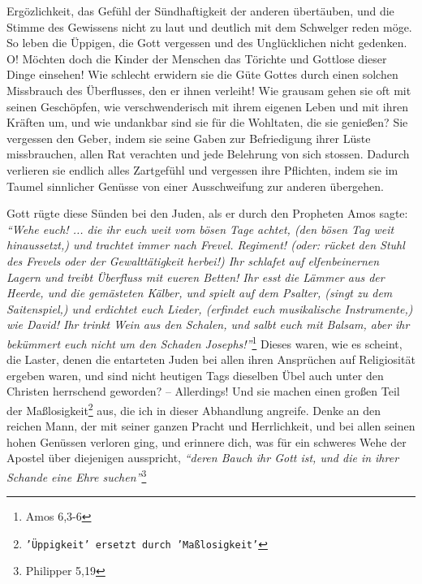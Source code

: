 Ergözlichkeit, das Gefühl der Sündhaftigkeit der anderen
übertäuben, und die
Stimme des Gewissens nicht zu laut und deutlich mit
dem Schwelger
reden möge. So
leben die Üppigen, die Gott vergessen und des Unglücklichen nicht gedenken. O!
Möchten doch die Kinder der Menschen das Törichte und Gottlose dieser Dinge
einsehen! Wie schlecht erwidern sie die Güte Gottes durch einen solchen
Missbrauch des Überflusses, den er ihnen verleiht! Wie grausam gehen sie oft
mit seinen Geschöpfen, wie verschwenderisch mit ihrem
eigenen Leben und mit
ihren Kräften um, und wie undankbar sind sie für die Wohltaten,
die sie
genießen? Sie vergessen den Geber, indem sie seine Gaben zur Befriedigung ihrer
Lüste missbrauchen, allen Rat verachten und jede Belehrung von sich stossen.
Dadurch verlieren sie endlich alles Zartgefühl und vergessen ihre
Pflichten,
indem sie im Taumel sinnlicher Genüsse von einer Ausschweifung zur anderen
übergehen.

\medskip

Gott rügte diese Sünden bei den Juden, als er durch den
Propheten Amos sagte:
\textit{"`Wehe euch! ... die ihr euch weit vom bösen Tage achtet, (den bösen Tag
weit
hinaussetzt,) und trachtet immer nach Frevel. Regiment! (oder: rücket den Stuhl
des Frevels oder der Gewalttätigkeit herbei!) Ihr schlafet auf elfenbeinernen
Lagern und treibt Überfluss mit eueren Betten! Ihr esst die Lämmer aus der
Heerde, und die gemästeten Kälber, und spielt auf dem Psalter, (singt zu dem
Saitenspiel,) und erdichtet euch Lieder, (erfindet euch musikalische
Instrumente,) wie David! Ihr trinkt Wein aus den Schalen, und salbt euch mit
Balsam, aber ihr bekümmert euch nicht um den Schaden Josephs!"'}\footnote{Amos
6,3-6}
Dieses waren, wie es scheint, die Laster, denen die entarteten
Juden bei allen ihren Ansprüchen auf
Religiosität ergeben waren,
und sind nicht
heutigen Tags dieselben Übel auch unter den Christen
herrschend geworden? --
Allerdings! Und sie machen einen großen Teil der
Maßlosigkeit\footnote{\texttt{'Üppigkeit' ersetzt
durch 'Maßlosigkeit'}} aus, die ich in
dieser Abhandlung angreife. Denke an den reichen Mann, der mit seiner ganzen
Pracht und Herrlichkeit, und bei allen seinen hohen Genüssen verloren ging, und
erinnere dich, was für ein schweres Wehe der Apostel über diejenigen ausspricht,
\textit{"`deren Bauch ihr Gott ist, und die in ihrer Schande eine Ehre
suchen"'}\footnote{Philipper 5,19}

